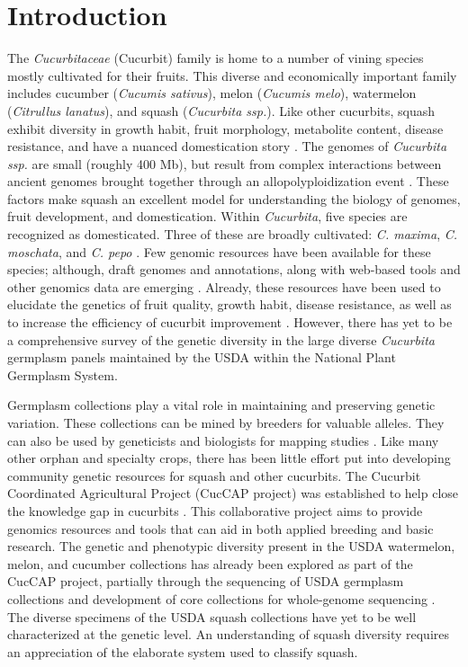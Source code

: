 \documentclass[utf8]{FrontiersinHarvard} %
\begin{document}
\section{Introduction}

The \emph{Cucurbitaceae} (Cucurbit) family is home to a number of vining species
mostly cultivated for their fruits.
This diverse and economically important family includes cucumber (\emph{Cucumis sativus}), melon (\emph{Cucumis melo}), watermelon (\emph{Citrullus lanatus}), and squash (\emph{Cucurbita ssp.})\citep{Ferriol}.
Like other cucurbits, squash exhibit diversity in growth habit, fruit morphology, metabolite content, disease resistance, and have a nuanced domestication story \citep{Chomicki2020,Paris2005}.
The genomes of \emph{Cucurbita ssp.} are small (roughly 400 Mb), but result from complex interactions between ancient genomes brought together through an allopolyploidization event \citep{Sun2017}.
These factors make squash an excellent model for understanding the biology of genomes, fruit development, and domestication.
Within \emph{Cucurbita}, five species are recognized as domesticated.
Three of these are broadly cultivated: \emph{C. maxima}, \emph{C. moschata}, and \emph{C. pepo} \citep{Ferriol}.
Few genomic resources have been available for these species; although, draft genomes and annotations, along with web-based tools and other genomics data are emerging \citep{Yu2022}.
Already, these resources have been used to elucidate the genetics of fruit quality, growth habit, disease resistance, as well as to increase the efficiency of cucurbit improvement \citep{MonteroPau2017,Zhong2017,Kazminska2018,Wu2019,Xanthopoulou2019,Hernandez2020}. However, there has yet to be a comprehensive survey of the genetic diversity in the large diverse \emph{Cucurbita} germplasm panels maintained by the USDA within the National Plant Germplasm System.

Germplasm collections play a vital role in maintaining and preserving genetic variation.
These collections can be mined by breeders for valuable alleles. They can also be used by geneticists and biologists for mapping studies \citep{McCouch2020}.
Like many other orphan and specialty crops, there has been little effort put into developing community genetic resources for squash and other cucurbits.
The Cucurbit Coordinated Agricultural Project (CucCAP project) was established to help close the knowledge gap in cucurbits \citep{Grumet2021}.
This collaborative project aims to provide genomics resources and tools that can aid in both applied breeding and basic research.
The genetic and phenotypic diversity present in the USDA watermelon, melon, and cucumber collections has already been explored as part of the CucCAP project, partially through the sequencing of USDA germplasm collections and development of core collections for whole-genome sequencing \citep{Wang2021,Wang2018,Wu2019a}.
The diverse specimens of the USDA squash collections have yet to be well characterized at the genetic level. An understanding of squash diversity requires an appreciation of the elaborate system used to classify squash.
\end{document}
